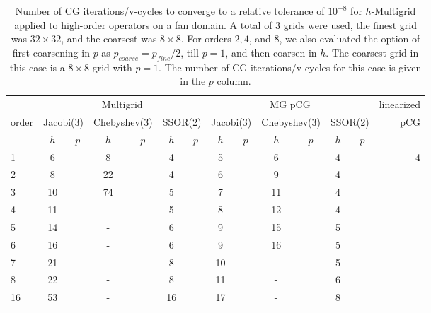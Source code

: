 \begin{table}
  \caption{\label{tab:fan}  Number of CG iterations/v-cycles to converge to a relative tolerance of $10^{-8}$ for $h$-Multigrid applied to high-order operators on a fan domain. A total of 3 grids were used, the finest grid was $32\times 32$, and the coarsest was $8\times 8$. For orders $2,4$, and $8$, we also evaluated the option of first coarsening in $p$ as $p_{coarse} = p_{fine}/2$, till $p=1$, and then coarsen in $h$. The coarsest grid in this case is a $8\times 8$ grid with $p=1$. The number of CG iterations/v-cycles for this case is given in the $p$ column.}
		\centering
    \begin{tabular}{|l|c|c|c|c|c|c|c|c|c|c|c|c|r|} 
\hline
		 & \multicolumn{6}{c|}{Multigrid} & \multicolumn{6}{c|}{MG pCG} &          linearized \\
		\cline{2-13}
		order &  \multicolumn{2}{c|}{\scriptsize  Jacobi(3)} &  \multicolumn{2}{c|}{\scriptsize Chebyshev(3)} & \multicolumn{2}{c|}{\scriptsize  SSOR(2)} & \multicolumn{2}{c|}{\scriptsize Jacobi(3)} &  \multicolumn{2}{c|}{\scriptsize Chebyshev(3)} & \multicolumn{2}{c|}{\scriptsize SSOR(2)} & pCG\\
				 \hline
				  & $h$ & $p$ & $h$ & $p$& $h$ & $p$& $h$ & $p$& $h$ & $p$& $h$ & $p$& \\
				  \cline{2-13}
          1 & 6  & & 8  & & 4 & & 5  & & 6  & & 4 & & 4 \\
          2 & 8  & & 22 & & 4 & & 6  & & 9  & & 4 & &   \\
          3 & 10 & & 74 & & 5 & & 7  & & 11 & & 4 & &   \\
          4 & 11 & & -  & & 5 & & 8  & & 12 & & 4 & &   \\
          5 & 14 & & -  & & 6 & & 9  & & 15 & & 5 & &   \\ 
          6 & 16 & & -  & & 6 & & 9  & & 16 & & 5 & &   \\
          7 & 21 & & -  & & 8 & & 10 & & -  & & 5 & &   \\
          8 & 22 & & -  & & 8 & & 11 & & -  & & 6 & &   \\
          16 & 53 & & - & & 16 & & 17 & & - & & 8 & &  \\
\hline
	  \end{tabular}
\end{table}


